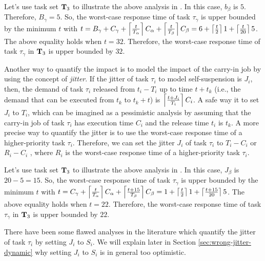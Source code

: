 \begin{table}[t]
\begin{table}[t]
\begin{itemize}
Let's use task set ${\bf T}_3$ to illustrate the above analysis in \cite[Page 164-165]{Liu:2000:RS:518501}. In this case, $b_\beta$ is $5$. Therefore, $B_\gamma = 5$. So, the worst-case response time of task $\tau_\gamma$ is upper bounded by the minimum $t$ with $t=B_\gamma+C_\gamma+\left\lceil{\frac{t}{T_\alpha}}\right\rceil C_\alpha +\left\lceil{\frac{t}{T_{\beta}}}\right\rceil C_\beta = 6+\left\lceil{\frac{t}{2}}\right\rceil 1 +\left\lceil{\frac{t}{20}}\right\rceil 5$. The above equality holds when $t=32$. Therefore, the worst-case response time of task $\tau_{\gamma}$ in ${\bf T}_3$ is upper bounded by $32$.
\vspace{0.1in}


Another way to quantify the impact is to model the impact of the carry-in job by using the concept of \emph{jitter}. If the jitter of task $\tau_i$ to model self-suspension is $J_i$, then, the demand of task $\tau_i$ released from $t_i-T_i$ up to time $t+t_k$  (i.e., the demand that can be executed from $t_k$ to $t_k+t$) is $\left\lceil{\frac{t+J_i}{T_i} }\right\rceil C_i$. A safe way it to set $J_i$ to $T_i$, which can be imagined as a pessimistic analysis by assuming that the carry-in job of task $\tau_i$ has execution time $C_i$ and the release time $t_i$ is $t_k$. A more precise way to quantify the jitter is to use the worst-case response time of a higher-priority task $\tau_i$. Therefore, we can set the jitter $J_i$ of task $\tau_i$ to $T_i-C_i$ \cite{huangpass:dac2015,Raj:suspension1991} or  $R_i-C_i$ \cite{huangpass:dac2015}, where $R_i$ is the worst-case response time of a higher-priority task $\tau_i$. 

Let's use task set ${\bf T}_3$ to illustrate the above analysis in \cite{huangpass:dac2015}. In this case, $J_\beta$ is $20-5=15$. So, the worst-case response time of task $\tau_\gamma$ is upper bounded by the minimum $t$ with $t=C_\gamma+\left\lceil{\frac{t}{T_\alpha}}\right\rceil C_\alpha +\left\lceil{\frac{t+15}{T_{\beta}}}\right\rceil C_\beta = 1+\left\lceil{\frac{t}{2}}\right\rceil 1 +\left\lceil{\frac{t+15}{20}}\right\rceil 5$. The above equality holds when $t=22$. Therefore, the worst-case response time of task $\tau_{\gamma}$ in ${\bf T}_3$ is upper bounded by $22$.


There have been some flawed analyses in the literature \cite{ECRTS-AudsleyB04,RTAS-AudsleyB04,RTCSA-KimCPKH95} which quantify the jitter of task $\tau_i$ by setting $J_i$ to $S_i$. We will explain later in Section \ref{sec:wrong-jitter-dynamic} why setting $J_i$ to $S_i$ is in general too optimistic. 


\end{itemize}
\end{table}
\end{table}
